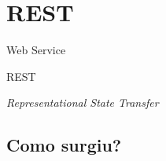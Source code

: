 \documentclass[
	9pt, %
	t, %
]{beamer}
\begin{document}

\section{REST}

\begin{frame}
	\begin{center}
		
		\bigskip\bigskip\bigskip\bigskip %
		{\Large Web Service}
		
		\bigskip\bigskip %
		{\Huge REST}
		
		\smallskip
		{\small \textit{Representational State Transfer}}
	\end{center}

\end{frame}

\subsection{Como surgiu?}
\end{document}
